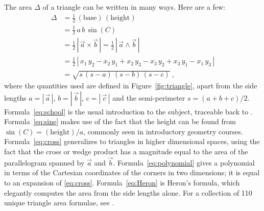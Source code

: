 \documentclass[10pt]{article}
\newcommand{\secbreak}{\bigskip{\centering\footnotesize $\triangle~~~\triangle~~~\triangle$\par}\bigskip\noindent}
\newcommand{\abs}[1]{|\,{#1}\,|}
\begin{document}
\secbreak
The area $\Delta$ of a triangle can be written in many ways.
Here are a few:
\begin{align}
\Delta 
&= \frac{1}{2} \, (\text{base}) \, (\text{height}) \label{eq:school} \\
&= \frac{1}{2}\,a\,b\,\sin(C) \label{eq:sine} \\
&= \frac{1}{2}\, \abs{\vec{a} \times \vec{b}}
    = \frac{1}{2}\, \abs{\vec{a} \wedge \vec{b}}\label{eq:cross} \\
&= \frac{1}{2}\, \abs{
    x_1 \, y_2 - x_2 \, y_1 +
    x_2 \, y_3 - x_3 \, y_2 +
    x_3 \, y_1 - x_1 \, y_3
}\label{eq:polynomial} \\
&= \sqrt{s\,(s-a)\,(s-b)\,(s-c)} \label{eq:Heron} ~,
\end{align}
where the quantities used are defined in Figure~\ref{fig:triangle}, apart from the side lengths
$a = \abs{\vec{a}}$, $b = \abs{\vec{b}}$, $c = \abs{\vec{c}}$
and the semi-perimeter $s = (a + b + c)/2$.
Formula~\eqref{eq:school} is the usual introduction to the subject, traceable back to \citet{Euclid300BC}.
Formula~\eqref{eq:sine} makes use of the fact that the height can be found from $\sin(C) = (\text{height}) / a$, commonly seen in introductory geometry courses.
Formula~\eqref{eq:cross} generalizes to triangles in higher dimensional spaces, using the fact that the cross or wedge product has a magnitude equal to the area of the parallelogram spanned by $\vec{a}$ and $\vec{b}$.
Formula~\eqref{eq:polynomial} gives a polynomial in terms of the Cartesian coordinates of the corners in two dimensions; it is equal to an expansion of \eqref{eq:cross}.
Formula~\eqref{eq:Heron} is Heron's formula, which elegantly computes the area from the side lengths alone.
For a collection of 110 unique triangle area formulae, see \citet{Baker1885a,Baker1885b}.
\end{document}

